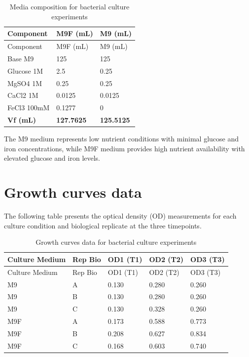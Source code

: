 \documentclass[
  11pt,
  a4paper,
]{report}
\begin{document}
\begin{longtable}[]{@{}lll@{}}
\caption{Media composition for bacterial culture
experiments}\label{tbl-media}\tabularnewline
\toprule\noalign{}
Component & M9F (mL) & M9 (mL) \\
\midrule\noalign{}
\endfirsthead
\toprule\noalign{}
Component & M9F (mL) & M9 (mL) \\
\midrule\noalign{}
\endhead
\bottomrule\noalign{}
\endlastfoot
Base M9 & 125 & 125 \\
Glucose 1M & 2.5 & 0.25 \\
MgSO4 1M & 0.25 & 0.25 \\
CaCl2 1M & 0.0125 & 0.0125 \\
FeCl3 100mM & 0.1277 & 0 \\
\textbf{Vf (mL)} & \textbf{127.7625} & \textbf{125.5125} \\
\end{longtable}

The M9 medium represents low nutrient conditions with minimal glucose
and iron concentrations, while M9F medium provides high nutrient
availability with elevated glucose and iron levels.

\section{Growth curves data}\label{sec-appendix-growth}

The following table presents the optical density (OD) measurements for
each culture condition and biological replicate at the three timepoints.

\begin{longtable}[]{@{}lllll@{}}
\caption{Growth curves data for bacterial culture
experiments}\label{tbl-growth-curves}\tabularnewline
\toprule\noalign{}
Culture Medium & Rep Bio & OD1 (T1) & OD2 (T2) & OD3 (T3) \\
\midrule\noalign{}
\endfirsthead
\toprule\noalign{}
Culture Medium & Rep Bio & OD1 (T1) & OD2 (T2) & OD3 (T3) \\
\midrule\noalign{}
\endhead
\bottomrule\noalign{}
\endlastfoot
M9 & A & 0.130 & 0.280 & 0.260 \\
M9 & B & 0.130 & 0.280 & 0.260 \\
M9 & C & 0.130 & 0.328 & 0.260 \\
M9F & A & 0.173 & 0.588 & 0.773 \\
M9F & B & 0.208 & 0.627 & 0.834 \\
M9F & C & 0.168 & 0.603 & 0.740 \\
\end{longtable}
\end{document}
